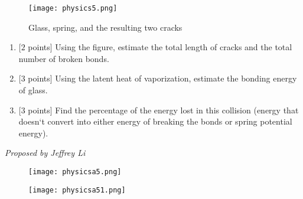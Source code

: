 \begin{enumerate}[align=left,start=1,label=\textbf{\textcolor{meared}{Problem \arabic*}}]
        \begin{figure}[!ht]
            \centering
            \texttt{[image: physics5.png]}
            \caption{Glass, spring, and the resulting two cracks}
        \end{figure}

        \begin{enumerate}
            \item {[$2$ points]} Using the figure, estimate the total length of cracks and the total number of broken bonds.
            \item {[$3$ points]} Using the latent heat of vaporization, estimate the bonding energy of glass.
            \item {[$3$ points]} Find the percentage of the energy lost in this collision (energy that doesn`t convert into either energy of breaking the bonds or spring potential energy).
        \end{enumerate}

        \textrm{\emph{Proposed by Jeffrey Li}}

        \begin{figure}[!ht]
            \centering
            \texttt{[image: physicsa5.png]}
        \end{figure}
        \begin{figure}[!ht]
            \centering
            \texttt{[image: physicsa51.png]}
        \end{figure}
\end{enumerate}

